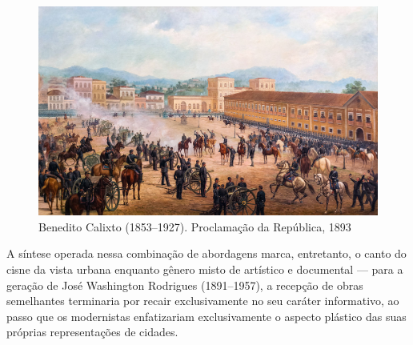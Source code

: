 \begin{figure}
\hypertarget{fig:calixto}{%
\centering
\includegraphics{figures/Proclamacao_da_Republica_by_Benedito_Calixto_1893.jpeg}
\caption{Benedito Calixto (1853--1927). Proclamação da República,
1893}\label{fig:calixto}
}
\end{figure}

A síntese operada nessa combinação de abordagens marca, entretanto, o
canto do cisne da vista urbana enquanto gênero misto de artístico e
documental --- para a geração de José Washington Rodrigues (1891--1957),
a recepção de obras semelhantes terminaria por recair exclusivamente no
seu caráter informativo, ao passo que os modernistas enfatizariam
exclusivamente o aspecto plástico das suas próprias representações de
cidades.
